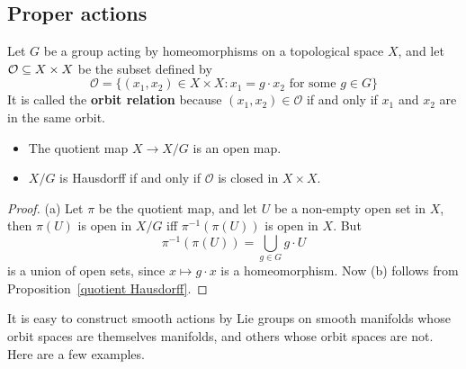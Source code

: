 \subsection{Proper actions}
\begin{lemma}\label{orbit space Huasdorff iff}
Let $G$ be a group acting by homeomorphisms on a topological space $X$, and let $\mathcal{O}\subseteq X\times X$ be the subset defined by
\[\mathcal{O}=\{(x_1,x_2)\in X\times X:x_1=g\cdot x_2\text{ for some $g\in G$}\}\]
It is called the \textbf{orbit relation} because $(x_1,x_2)\in\mathcal{O}$ if and only if $x_1$ and $x_2$ are in the same orbit.
\begin{itemize}
\item[(a)] The quotient map $X\to X/G$ is an open map.
\item[(b)] $X/G$ is Hausdorff if and only if $\mathcal{O}$ is closed in $X\times X$.
\end{itemize}
\end{lemma}
\begin{proof}
(a) Let $\pi$ be the quotient map, and let $U$ be a non-empty open set in $X$, then $\pi(U)$ is open in $X/G$ iff $\pi^{-1}(\pi(U))$ is open in $X$. But
\[\pi^{-1}(\pi(U))=\bigcup_{g\in G}g\cdot U\]
is a union of open sets, since $x\mapsto g\cdot x$ is a homeomorphism. Now (b) follows from Proposition~\ref{quotient Hausdorff}.
\end{proof}
It is easy to construct smooth actions by Lie groups on smooth manifolds whose orbit spaces are themselves manifolds, and others whose orbit spaces are not. Here are a few examples.
